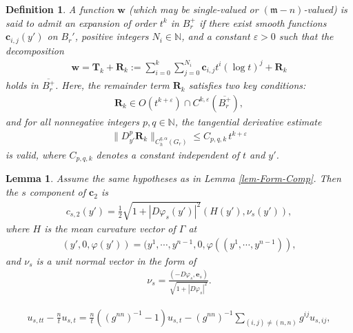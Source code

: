 \documentclass[10pt,a4paper]{amsart}
\newtheorem{lemma}{Lemma}
\newtheorem{definition}{Definition}
\renewcommand{\epsilon}{\varepsilon}
\newcommand{\fm}{\mathfrak{m}}
\renewcommand{\leq}{\leqslant}
\begin{document}
\begin{definition}\label{def-exp}
A function $\mathbf{w}$ (which may be single-valued or $(\fm-n)$-valued) is said to admit an expansion of order $t^k$ in $B^+_r$ if there exist smooth functions $\mathbf{c}_{i,j}(y')$ on $B_r'$, positive integers $N_i\in \mathbb{N}$, and a constant $\epsilon>0$ such that the decomposition
\begin{align}\label{eq-Taylor}
    \mathbf{w} = \mathbf{T}_k +\mathbf{R}_k := \sum_{i=0}^k \sum_{j=0}^{N_i} \mathbf{c}_{i,j} t^i (\log t)^j+\mathbf{R}_k
\end{align}
holds in $\overline{B^+_r}$. Here, the remainder term $\mathbf{R}_k$ satisfies two key conditions:
\begin{align}\label{eq-Rk-Cke}
 \mathbf{R}_k \in O(t^{k+\epsilon})\cap C^{k,\epsilon}(\overline{B^+_r}),
\end{align}
and for all nonnegative integers $p, q \in \mathbb{N}$, the tangential derivative estimate
\begin{align}\label{eq-Rk-Tan}
    \|D_{y'}^p \mathbf{R}_k \|_{C^{q,\alpha}_h(G_r)}\leq C_{p,q,k}\,t^{k+\epsilon}
\end{align}
is valid, where $C_{p,q,k}$ denotes a constant independent of $t$ and $y'$.
\end{definition}

\begin{lemma}\label{lem-c2} Assume the same hypotheses as in Lemma \ref{lem-Form-Comp}. Then the $s$ component of $\mathbf c_{2}$ is
\begin{align}\label{eq-c-s2}
    c_{s,2}(y') = \frac{1}{2}\sqrt{1+|D\varphi_s(y')|^2} (H(y'), \nu_s(y')),
\end{align}
where $H$ is the mean curvature vector of $\Gamma$ at 
\begin{align}
 (y', 0, \varphi(y')) = (y^1,\cdots, y^{n-1}, 0, \varphi((y^1,\cdots, y^{n-1})),  
\end{align} and $\nu_s$ is a unit normal vector in the form of
\begin{align}
    \nu_s = \frac{(-D\varphi_s, \mathbf e_s)}{\sqrt{1+|D \varphi_s|^2}}.
\end{align}
\end{lemma}

    \begin{align}\label{eq-main-comp1}
        u_{s, tt} -\frac{n}{t} u_{s,t} = \frac{n}{t}((g^{nn})^{-1}-1)u_{s, t} -(g^{nn})^{-1}\sum_{(i,j)\neq (n,n)}g^{ij}u_{s,ij},
    \end{align}
\end{document}
